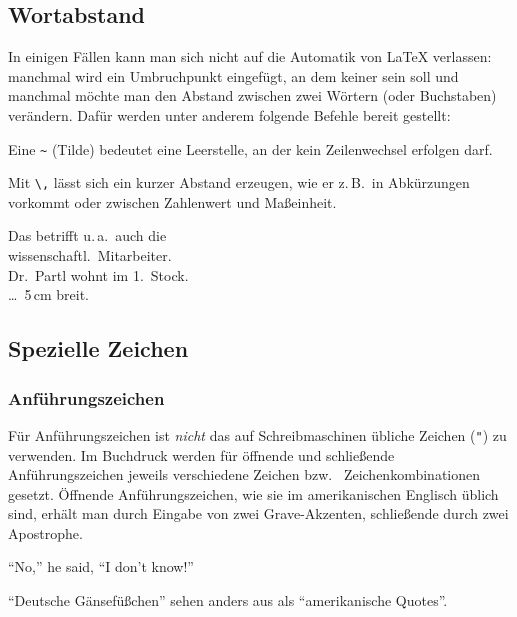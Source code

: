 

\subsection{Wortabstand} \label{abstaende}

In einigen Fällen kann man sich nicht auf die Automatik von \LaTeX{} verlassen: manchmal wird ein Umbruchpunkt eingefügt, an dem keiner sein soll und manchmal möchte man den Abstand zwischen zwei Wörtern (oder Buchstaben) verändern. Dafür werden unter anderem folgende Befehle bereit gestellt:

Eine \lstinline|~| (Tilde) bedeutet eine Leerstelle, an der kein Zeilenwechsel
erfolgen darf.

Mit \lstinline|\,| lässt sich ein kurzer Abstand erzeugen, wie er z.\,B.\ in
Abkürzungen vorkommt oder zwischen Zahlenwert und Maßeinheit.


\begin{LTXexample}
Das betrifft u.\,a.\ auch die \\
wissenschaftl.\ Mitarbeiter. \\
Dr.~Partl wohnt im 1.~Stock. \\
\dots\ 5\,cm breit.
\end{LTXexample}


\subsection{Spezielle Zeichen} \label{spezial}

\subsubsection{Anführungszeichen} \label{quotes}

Für Anführungszeichen ist \emph{nicht} das auf Schreibmaschinen
übliche Zeichen (\lstinline|"|) zu verwenden.
Im Buchdruck werden für öffnende und schließende
Anführungszeichen jeweils verschiedene Zeichen bzw.\ %
Zeichenkombinationen gesetzt.
Öffnende Anführungszeichen, wie sie im amerikanischen Englisch
üblich sind, erhält man durch Eingabe von zwei Grave-Akzenten,
schließende durch zwei Apostrophe.
\begin{LTXexample}
``No,'' he said,
``I don't know!''
\end{LTXexample}
"`Deutsche Gänsefüßchen"' sehen anders aus als ``amerikanische
Quotes''.


